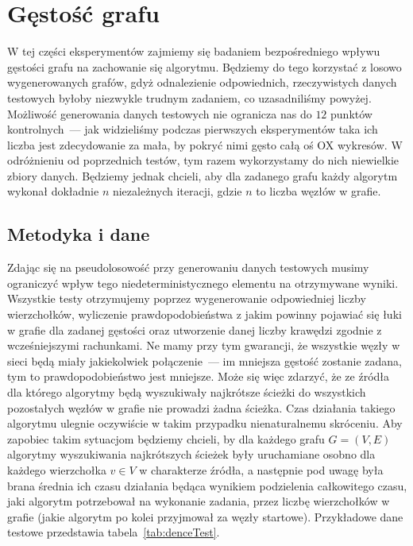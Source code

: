 \section{Gęstość grafu}




W tej części eksperymentów zajmiemy się badaniem bezpośredniego wpływu gęstości grafu na zachowanie się algorytmu.
Będziemy do tego korzystać z losowo wygenerowanych grafów, gdyż odnalezienie odpowiednich, rzeczywistych danych testowych byłoby niezwykle trudnym zadaniem, co uzasadniliśmy powyżej.
Możliwość generowania danych testowych nie ogranicza nas do $12$ punktów kontrolnych~--- jak widzieliśmy podczas pierwszych eksperymentów taka ich liczba jest zdecydowanie za mała, by pokryć nimi gęsto całą oś \textsc{OX} wykresów.
W odróżnieniu od poprzednich testów, tym razem wykorzystamy do nich niewielkie zbiory danych. Będziemy jednak chcieli, aby dla zadanego grafu każdy algorytm wykonał dokładnie $n$ niezależnych iteracji, gdzie $n$ to liczba węzłów w grafie.



\subsection{Metodyka i dane}



Zdając się na pseudolosowość przy generowaniu danych testowych musimy ograniczyć wpływ tego niedeterministycznego elementu na otrzymywane wyniki.
Wszystkie testy otrzymujemy poprzez wygenerowanie odpowiedniej liczby wierzchołków, wyliczenie prawdopodobieństwa z jakim powinny pojawiać się łuki w grafie dla zadanej gęstości oraz utworzenie danej liczby krawędzi zgodnie z wcześniejszymi rachunkami.
Ne mamy przy tym gwarancji, że wszystkie węzły w sieci będą miały jakiekolwiek połączenie~--- im mniejsza gęstość zostanie zadana, tym to prawdopodobieństwo jest mniejsze.
Może się więc zdarzyć, że ze źródła dla którego algorytmy będą wyszukiwały najkrótsze ścieżki do wszystkich pozostałych węzłów w grafie nie prowadzi żadna ścieżka.
Czas działania takiego algorytmu ulegnie oczywiście w takim przypadku nienaturalnemu skróceniu.
Aby zapobiec takim sytuacjom będziemy chcieli, by dla każdego grafu $G = \left( V, E \right)$ algorytmy wyszukiwania najkrótszych ścieżek były uruchamiane osobno dla każdego wierzchołka $v \in V$ w charakterze źródła, a następnie pod uwagę była brana średnia ich czasu działania będąca wynikiem podzielenia całkowitego czasu, jaki algorytm potrzebował na wykonanie zadania, przez liczbę wierzchołków w grafie (jakie algorytm po kolei przyjmował za węzły startowe).
Przykładowe dane testowe przedstawia tabela~\ref{tab:denceTest}.

